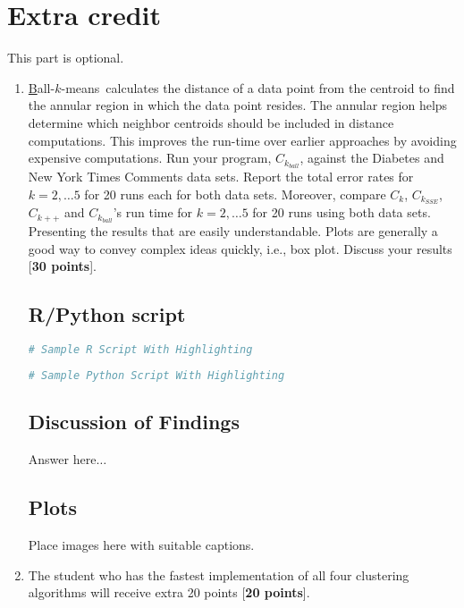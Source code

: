 \documentclass{article}
\def\kb{Ball-$k$-means}
\begin{document}
\newpage
\section*{Extra credit}

This part is optional. 


\begin{enumerate}



\item \href{https://ieeexplore.ieee.org/stamp/stamp.jsp?tp=&arnumber=9139397&tag=1}\kb \ calculates the distance of a data point from the centroid to find the annular region in which the data point resides. The annular region helps determine which neighbor centroids should be included in distance computations.  This improves the run-time over earlier approaches by avoiding expensive computations. Run  your program, $C_{k_{ball}}$, against the Diabetes and New York Times Comments data sets. Report the total error rates for $k = 2,\ldots 5$ for 20 runs each for both data sets. Moreover, compare $C_{k}$, $C_{k_{SSE}}$, $C_{k++}$ and $C_{k_{ball}}$'s run time for $k = 2,\ldots 5$ for 20 runs using both data sets. Presenting the results that are easily understandable.  Plots are generally a good way to convey complex ideas quickly, i.e., box plot.  Discuss  your results  [\textbf{30 points}].\\ 


\subsection{R/Python script }
\begin{lstlisting}[language=R]
# Sample R Script With Highlighting

\end{lstlisting}

\begin{lstlisting}[language=Python]
# Sample Python Script With Highlighting
\end{lstlisting}

\subsection{Discussion of Findings}
Answer here$\ldots$

\subsection{Plots }
Place images here with suitable captions.

\item The student who has the fastest implementation of  all four clustering algorithms  will receive extra 20 points [\textbf{20 points}]. 
\end{enumerate}
\end{document}
